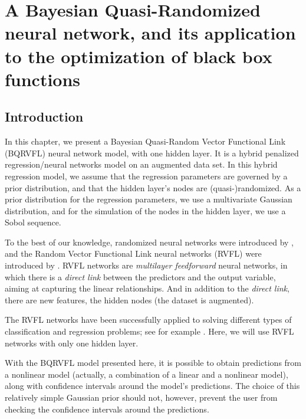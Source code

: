 %
\chapter{A Bayesian Quasi-Randomized neural network, and its application to the optimization of black box functions}
\label{sec:bayesian_rvfl}

\section{Introduction}
\label{intro}

In this chapter, we present a Bayesian Quasi-Random Vector Functional Link (BQRVFL) neural network model, with one hidden layer. It is a hybrid penalized regression/neural networks model on an augmented data set. In this hybrid regression model, we assume that the regression parameters are governed by a prior distribution, and that the hidden layer's nodes are (quasi-)randomized. As a prior distribution for the regression parameters, we use a multivariate Gaussian distribution, and for the simulation of the nodes in the hidden layer, we use a Sobol sequence. 

\medskip

To the best of our knowledge, randomized neural networks were introduced by \cite{schmidt1992feedforward}, and the Random Vector Functional Link neural networks (RVFL) were introduced by \cite{pao1994learning}. RVFL networks are \textit{multilayer feedforward} neural networks, in which there is a \textit{direct link} between the predictors and the output variable, aiming at capturing the linear relationships. And in addition to the \textit{direct link}, there are new features, the hidden nodes (the dataset is augmented).

\medskip

The RVFL networks have been successfully applied to solving different types of classification and regression problems; see for example \cite{dehuri2010comprehensive}. Here, we will use RVFL networks with only one hidden layer.

\medskip

With the BQRVFL model presented here, it is possible to obtain predictions from a nonlinear model (actually, a combination of a linear and a nonlinear model), along with confidence intervals around the model's predictions. The choice of this relatively simple Gaussian prior should not, however, prevent the user from checking the confidence intervals around the predictions. 

